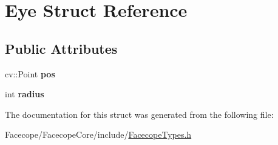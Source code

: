 \hypertarget{structEye}{}\section{Eye Struct Reference}
\label{structEye}
\subsection*{Public Attributes}
\begin{DoxyCompactItemize}
\item 
\mbox{\label{structEye_a4cb33f0dabcf790f90abd71012979b03}} 
cv\+::\+Point {\bfseries pos}
\item 
\mbox{\label{structEye_ad90751f53ebdeb95e0df5f75e0df4c80}} 
int {\bfseries radius}
\end{DoxyCompactItemize}


The documentation for this struct was generated from the following file\+:\begin{DoxyCompactItemize}
\item 
Facecope/\+Facecope\+Core/include/\hyperlink{FacecopeTypes_8h}{Facecope\+Types.\+h}\end{DoxyCompactItemize}

